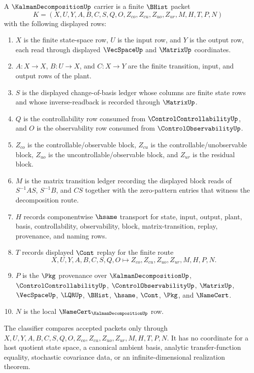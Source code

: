 \begin{definition}
\label{def:kalman-decomposition-carrier}
A $\KalmanDecompositionUp$ carrier is a finite $\BHist$ packet
$$
K=(X,U,Y,A,B,C,S,Q,O,Z_{co},Z_{cu},Z_{uo},Z_{ur},M,H,T,P,N)
$$
with the following displayed rows:
\begin{enumerate}
\item $X$ is the finite state-space row, $U$ is the input row, and $Y$ is the output row, each read through displayed $\VecSpaceUp$ and $\MatrixUp$ coordinates.
\item $A:X\to X$, $B:U\to X$, and $C:X\to Y$ are the finite transition, input, and output rows of the plant.
\item $S$ is the displayed change-of-basis ledger whose columns are finite state rows and whose inverse-readback is recorded through $\MatrixUp$.
\item $Q$ is the controllability row consumed from $\ControlControllabilityUp$, and $O$ is the observability row consumed from $\ControlObservabilityUp$.
\item $Z_{co}$ is the controllable/observable block, $Z_{cu}$ is the controllable/unobservable block, $Z_{uo}$ is the uncontrollable/observable block, and $Z_{ur}$ is the residual block.
\item $M$ is the matrix transition ledger recording the displayed block reads of $S^{-1}AS$, $S^{-1}B$, and $CS$ together with the zero-pattern entries that witness the decomposition route.
\item $H$ records componentwise $\hsame$ transport for state, input, output, plant, basis, controllability, observability, block, matrix-transition, replay, provenance, and naming rows.
\item $T$ records displayed $\Cont$ replay for the finite route
$$
X,U,Y,A,B,C,S,Q,O \longmapsto Z_{co},Z_{cu},Z_{uo},Z_{ur},M,H,P,N .
$$
\item $P$ is the $\Pkg$ provenance over $\KalmanDecompositionUp$, $\ControlControllabilityUp$, $\ControlObservabilityUp$, $\MatrixUp$, $\VecSpaceUp$, $\LQRUp$, $\BHist$, $\hsame$, $\Cont$, $\Pkg$, and $\NameCert$.
\item $N$ is the local $\NameCert_{\KalmanDecompositionUp}$ row.
\end{enumerate}
The classifier compares accepted packets only through $X,U,Y,A,B,C,S,Q,O,Z_{co},Z_{cu},Z_{uo},Z_{ur},M,H,T,P,N$. It has no coordinate for a host quotient state space, a canonical ambient basis, analytic transfer-function equality, stochastic covariance data, or an infinite-dimensional realization theorem.
\end{definition}

